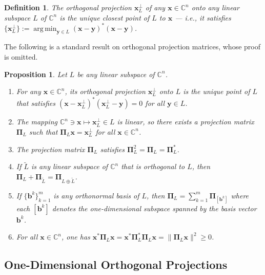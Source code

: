 \documentclass[11pt]{article}
\newcommand \C { \mathbb{C} }
\DeclareMathOperator*{\argmin}{{arg\, min}}
\newtheorem{proposition}[theorem]{Proposition}
\newtheorem{definition}[theorem]{Definition}
\begin{document}
\begin{definition}
	The \emph{orthogonal projection} $ \mathbf x^\perp _L $ of any $ \mathbf x \in \C^n $ 
	onto any linear subspace $L$ of $ \C^n $
	is the unique \emph{closest point} of $L$ to $ \mathbf x$
	--- i.e., it satisfies \( \{ \mathbf x^\perp _L \} 
 := \argmin _{ \mathbf y \in L} \mathbf {(x - y)}^* \mathbf {(x - y)} \).  
\end{definition}

The following is a standard result on orthogonal projection matrices, whose proof is omitted. 

\begin{proposition} \label{prop:projMatrices}
	Let $L$ be any linear subspace of $ \C^n $.
\begin{enumerate}
	\item For any $ \mathbf x \in \C^n $,
	its \emph{orthogonal projection} $ \mathbf x^\perp _L $ onto $L$ 
	is the unique point of $L$
	that satisfies $( \mathbf {x - x}^\perp _L )^* ( \mathbf x^\perp _L - \mathbf y) = 0$ 
	for all $ \mathbf y \in L$.
	\item The mapping $ \C^n \owns \mathbf x \mapsto \mathbf x^\perp _L \in L$ is linear,
	so there exists a \emph{projection matrix} $ \boldsymbol \Pi _L $
	such that $ \boldsymbol \Pi _L \mathbf x = \mathbf x^\perp _L $ 
	for all $ \mathbf x \in \C^n $.  
	\item The projection matrix $ \boldsymbol \Pi _L $ 
	satisfies $ \boldsymbol \Pi _L ^2 = \boldsymbol \Pi _L = \boldsymbol \Pi _L^* $.
	\item If $ \tilde L$ is any linear subspace of $ \C^n $ that is orthogonal to $L$,
	then $ \boldsymbol \Pi _L + \boldsymbol \Pi _{ \tilde L} 
	= \boldsymbol \Pi _{L \oplus \tilde L} $.
	\item If $ \{ \mathbf b^k \}_{k = 1}^m $ is any orthonormal basis of $L$,
	then $ \boldsymbol \Pi _L = \sum _{k = 1}^m \boldsymbol \Pi _{[ \mathbf b^k ]} $
	where each $[ \mathbf b^k ]$ denotes the one-dimensional subspace
	spanned by the basis vector $ \mathbf b^k $.
	\item For all $ \mathbf x \in \C^n $, one has
 \( \mathbf x^* \boldsymbol \Pi _L \mathbf x 
 = \mathbf x^* \boldsymbol \Pi^* _L \boldsymbol \Pi _L \mathbf x 
 = \| \boldsymbol \Pi _L \mathbf x \|^2 \ge 0 \).  
\end{enumerate}
\end{proposition}

\subsection{One-Dimensional Orthogonal Projections}
\end{document}
